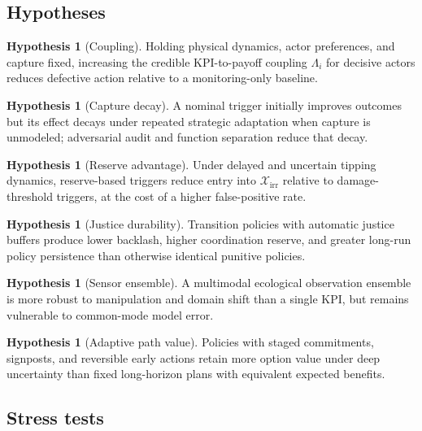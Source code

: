 \documentclass[11pt,a4paper]{article}
\numberwithin{equation}{section}
\theoremstyle{definition}
\newtheorem{hypothesis}[definition]{Hypothesis}
\theoremstyle{plain}
\theoremstyle{remark}
\newcommand{\irrev}{\mathcal{X}_{\mathrm{irr}}}
\begin{document}
\subsection{Hypotheses}

\begin{hypothesis}[Coupling]
Holding physical dynamics, actor preferences, and capture fixed, increasing the credible KPI-to-payoff coupling $\Lambda_i$ for decisive actors reduces defective action relative to a monitoring-only baseline.
\end{hypothesis}

\begin{hypothesis}[Capture decay]
A nominal trigger initially improves outcomes but its effect decays under repeated strategic adaptation when capture is unmodeled; adversarial audit and function separation reduce that decay.
\end{hypothesis}

\begin{hypothesis}[Reserve advantage]
Under delayed and uncertain tipping dynamics, reserve-based triggers reduce entry into $\irrev$ relative to damage-threshold triggers, at the cost of a higher false-positive rate.
\end{hypothesis}

\begin{hypothesis}[Justice durability]
Transition policies with automatic justice buffers produce lower backlash, higher coordination reserve, and greater long-run policy persistence than otherwise identical punitive policies.
\end{hypothesis}

\begin{hypothesis}[Sensor ensemble]
A multimodal ecological observation ensemble is more robust to manipulation and domain shift than a single KPI, but remains vulnerable to common-mode model error.
\end{hypothesis}

\begin{hypothesis}[Adaptive path value]
Policies with staged commitments, signposts, and reversible early actions retain more option value under deep uncertainty than fixed long-horizon plans with equivalent expected benefits.
\end{hypothesis}

\subsection{Stress tests}
\end{document}
